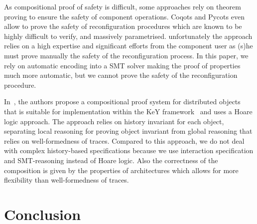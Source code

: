 \documentclass{llncs}
\begin{document}
As compositional proof of safety is difficult, some approaches rely on theorem proving to ensure the safety of component operations. Coqots and Pycots\cite{BCDLM:CBSE2014} even allow to prove the safety of reconfiguration procedures which are known to be highly difficult to verify, and massively parametrised. unfortunately the approach relies on a high expertise and significant efforts from the component user as (s)he must prove manually the safety of the reconfiguration process. In this paper, we rely on automatic encoding into a SMT solver making the proof of properties much more automatic, but we cannot prove the safety of the reconfiguration procedure.




In~\cite{DDJO:JLAMP2012}, the authors propose a compositional proof system for distributed objects that is suitable for implementation within the KeY framework~\cite{BHS:Key2007} and uses a Hoare logic approach.
The approach relies on history invariant for each object, separating local reasoning for proving object invariant from global reasoning that relies on well-formedness of traces. Compared to this  approach, we do not  deal with complex history-based specifications because we use interaction specification and SMT-reasoning instead of Hoare logic. Also the correctness of the composition is given by the properties of architectures which allows for more flexibility than well-formedness of traces.








\section{Conclusion}
\label{secn:conclusion}
\end{document}

